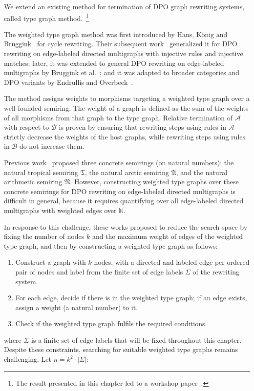 We extend an existing method for termination of DPO graph rewriting systems, called type graph method.~\footnote{The result presented in this chapter led to a workshop paper~\cite{qiu2025termination_nwf_v2_acceptedgcm}.}

The weighted type graph method was first introduced by Hans, K{\"{o}}nig and Bruggink~\cite{zantema2014termination} for cycle rewriting. Their subsequent work~\cite{bruggink2014termination} generalized it for DPO rewriting on edge-labeled directed multigraphs with injective rules and injective matches; later, it was extended to general DPO rewriting on edge-labeled multigraphs by Bruggink et al.~\cite{bruggink2015proving}; and it was adapted to broader categories and DPO variants by Endrullis and Overbeek~\cite{endrullis2024generalized_icgt}.

The method assigns weights to morphisms targeting a weighted type graph over a well-founded semiring. The weight of a graph is defined
 as the sum of the weights of all morphisms from that graph to the type graph. Relative termination of $\mathcal{A}$ with respect to $\mathcal{B}$ is proven by ensuring that rewriting steps using rules in \( \mathcal{A} \) strictly decrease the weights of the host graphs, while rewriting steps using rules in \( \mathcal{B} \) do not increase them.
    
   Previous work~\cite{zantema2014termination,bruggink2014termination,bruggink2015proving} proposed three concrete semirings (on natural numbers): the natural tropical semiring $\mathfrak{T}$, the natural arctic semiring $\mathfrak{A}$, and the natural arithmetic semiring $\mathfrak{N}$.
    However, constructing weighted type graphs over these concrete semirings for DPO rewriting on edge-labeled directed multigraphs is difficult in general, because it requires quantifying over all edge-labeled directed multigraphs with weighted edges over $\mathbb{N}$.

    In response to this challenge, these works proposed to reduce the search space by fixing the number of nodes \( k\) and the maximum weight of edges of the weighted type graph, and then by constructing a weighted type graph as follows: 
    \begin{enumerate}
      \item Construct a graph with \( k \) nodes, with a directed and labeled edge per ordered pair of nodes and label from the finite set of edge labels $\Sigma$ of the rewriting system. 
      \item For each edge, decide if there is in the weighted type graph;  if an edge exists, assign a weight (a natural number) to it.
      \item Check if the weighted type graph fulfils the required conditions.
    \end{enumerate}
    where $\Sigma$ is a finite set of edge labels that will be fixed throughout this chapter.
    Despite these constraints, searching for suitable weighted type graphs
    remains challenging. 
    Let $n \mathop{=} k^2 \cdot | \Sigma |$:
    
